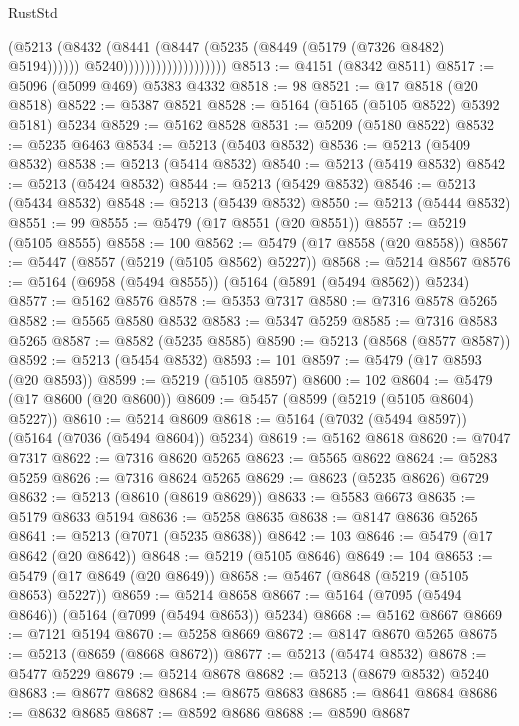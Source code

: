 \begin{lexlean}{RustStd}
\begin{coremodule}
                                        (@5213
                                          (@8432
                                            (@8441
                                              (@8447 (@5235 (@8449 (@5179 (@7326 @8482) @5194))))))
                                          @5240)))))))))))))))))))
@8513 := @4151 (@8342 @8511)
@8517 := @5096 (@5099 @469) @5383 @4332
@8518 := 98
@8521 := @17 @8518 (@20 @8518)
@8522 := @5387 @8521
@8528 := @5164 (@5165 (@5105 @8522) @5392 @5181) @5234
@8529 := @5162 @8528
@8531 := @5209 (@5180 @8522)
@8532 := @5235 @6463
@8534 := @5213 (@5403 @8532)
@8536 := @5213 (@5409 @8532)
@8538 := @5213 (@5414 @8532)
@8540 := @5213 (@5419 @8532)
@8542 := @5213 (@5424 @8532)
@8544 := @5213 (@5429 @8532)
@8546 := @5213 (@5434 @8532)
@8548 := @5213 (@5439 @8532)
@8550 := @5213 (@5444 @8532)
@8551 := 99
@8555 := @5479 (@17 @8551 (@20 @8551))
@8557 := @5219 (@5105 @8555)
@8558 := 100
@8562 := @5479 (@17 @8558 (@20 @8558))
@8567 := @5447 (@8557 (@5219 (@5105 @8562) @5227))
@8568 := @5214 @8567
@8576 := @5164 (@6958 (@5494 @8555)) (@5164 (@5891 (@5494 @8562)) @5234)
@8577 := @5162 @8576
@8578 := @5353 @7317
@8580 := @7316 @8578 @5265
@8582 := @5565 @8580 @8532
@8583 := @5347 @5259
@8585 := @7316 @8583 @5265
@8587 := @8582 (@5235 @8585)
@8590 := @5213 (@8568 (@8577 @8587))
@8592 := @5213 (@5454 @8532)
@8593 := 101
@8597 := @5479 (@17 @8593 (@20 @8593))
@8599 := @5219 (@5105 @8597)
@8600 := 102
@8604 := @5479 (@17 @8600 (@20 @8600))
@8609 := @5457 (@8599 (@5219 (@5105 @8604) @5227))
@8610 := @5214 @8609
@8618 := @5164 (@7032 (@5494 @8597)) (@5164 (@7036 (@5494 @8604)) @5234)
@8619 := @5162 @8618
@8620 := @7047 @7317
@8622 := @7316 @8620 @5265
@8623 := @5565 @8622
@8624 := @5283 @5259
@8626 := @7316 @8624 @5265
@8629 := @8623 (@5235 @8626) @6729
@8632 := @5213 (@8610 (@8619 @8629))
@8633 := @5583 @6673
@8635 := @5179 @8633 @5194
@8636 := @5258 @8635
@8638 := @8147 @8636 @5265
@8641 := @5213 (@7071 (@5235 @8638))
@8642 := 103
@8646 := @5479 (@17 @8642 (@20 @8642))
@8648 := @5219 (@5105 @8646)
@8649 := 104
@8653 := @5479 (@17 @8649 (@20 @8649))
@8658 := @5467 (@8648 (@5219 (@5105 @8653) @5227))
@8659 := @5214 @8658
@8667 := @5164 (@7095 (@5494 @8646)) (@5164 (@7099 (@5494 @8653)) @5234)
@8668 := @5162 @8667
@8669 := @7121 @5194
@8670 := @5258 @8669
@8672 := @8147 @8670 @5265
@8675 := @5213 (@8659 (@8668 @8672))
@8677 := @5213 (@5474 @8532)
@8678 := @5477 @5229
@8679 := @5214 @8678
@8682 := @5213 (@8679 @8532) @5240
@8683 := @8677 @8682
@8684 := @8675 @8683
@8685 := @8641 @8684
@8686 := @8632 @8685
@8687 := @8592 @8686
@8688 := @8590 @8687

\end{coremodule}
\end{lexlean}

